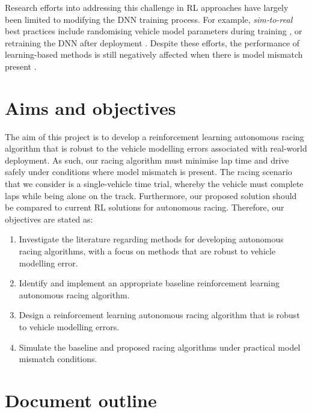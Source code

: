 Research efforts into addressing this challenge in RL approaches have largely been limited to modifying the DNN training process.
For example, \emph{sim-to-real} best practices include randomising vehicle model parameters during training \cite{Ivanov2020}, or retraining the DNN after deployment \cite{Zhou2020}.
Despite these efforts, the performance of learning-based methods is still negatively affected when there is model mismatch present \cite{hsu2022}.


\section{Aims and objectives}\label{sec:objectives}

The aim of this project is to develop a reinforcement learning autonomous racing algorithm that is robust to the vehicle modelling errors associated with real-world deployment.
As such, our racing algorithm must minimise lap time and drive safely under conditions where model mismatch is present.
The racing scenario that we consider is a single-vehicle time trial, whereby the vehicle must complete laps while being alone on the track.
Furthermore, our proposed solution should be compared to current RL solutions for autonomous racing.
Therefore, our objectives are stated as:
\begin{enumerate}
    \item Investigate the literature regarding methods for developing autonomous racing algorithms, with a focus on methods that are robust to vehicle modelling error.
    \item Identify and implement an appropriate baseline reinforcement learning autonomous racing algorithm.
    \item Design a reinforcement learning autonomous racing algorithm that is robust to vehicle modelling errors.
    \item Simulate the baseline and proposed racing algorithms under practical model mismatch conditions.
\end{enumerate}



\section{Document outline}\label{sec:outline}

